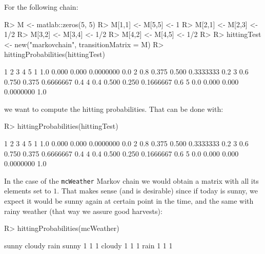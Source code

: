\documentclass[
  nojss]{jss}
\begin{document}
For the following chain:

\begin{CodeChunk}

\begin{CodeInput}
R> M <- matlab::zeros(5, 5)
R> M[1,1] <- M[5,5] <- 1
R> M[2,1] <- M[2,3] <- 1/2
R> M[3,2] <- M[3,4] <- 1/2
R> M[4,2] <- M[4,5] <- 1/2
R> 
R> hittingTest <- new("markovchain", transitionMatrix = M)
R> hittingProbabilities(hittingTest)
\end{CodeInput}

\begin{CodeOutput}
    1     2     3         4   5
1 1.0 0.000 0.000 0.0000000 0.0
2 0.8 0.375 0.500 0.3333333 0.2
3 0.6 0.750 0.375 0.6666667 0.4
4 0.4 0.500 0.250 0.1666667 0.6
5 0.0 0.000 0.000 0.0000000 1.0
\end{CodeOutput}
\end{CodeChunk}

we want to compute the hitting probabilities. That can be done with:

\begin{CodeChunk}

\begin{CodeInput}
R> hittingProbabilities(hittingTest)
\end{CodeInput}

\begin{CodeOutput}
    1     2     3         4   5
1 1.0 0.000 0.000 0.0000000 0.0
2 0.8 0.375 0.500 0.3333333 0.2
3 0.6 0.750 0.375 0.6666667 0.4
4 0.4 0.500 0.250 0.1666667 0.6
5 0.0 0.000 0.000 0.0000000 1.0
\end{CodeOutput}
\end{CodeChunk}

In the case of the \texttt{mcWeather} Markov chain we would obtain a matrix with all its elements set to \(1\). That makes sense (and is desirable) since if today is sunny, we expect it would be sunny again at certain point in the time, and the same with rainy weather (that way we assure good harvests):

\begin{CodeChunk}

\begin{CodeInput}
R> hittingProbabilities(mcWeather)
\end{CodeInput}

\begin{CodeOutput}
       sunny cloudy rain
sunny      1      1    1
cloudy     1      1    1
rain       1      1    1
\end{CodeOutput}
\end{CodeChunk}
\end{document}
